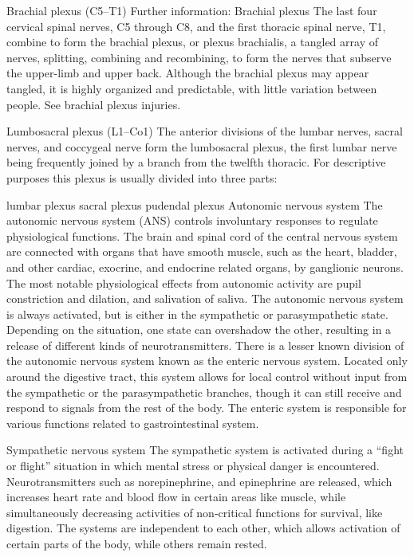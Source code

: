 Brachial plexus (C5--T1)
Further information: Brachial plexus
The last four cervical spinal nerves, C5 through C8, and the first thoracic spinal nerve, T1, combine to form the brachial plexus, or plexus brachialis, a tangled array of nerves, splitting, combining and recombining, to form the nerves that subserve the upper-limb and upper back. Although the brachial plexus may appear tangled, it is highly organized and predictable, with little variation between people. See brachial plexus injuries.

Lumbosacral plexus (L1--Co1)
The anterior divisions of the lumbar nerves, sacral nerves, and coccygeal nerve form the lumbosacral plexus, the first lumbar nerve being frequently joined by a branch from the twelfth thoracic. For descriptive purposes this plexus is usually divided into three parts:

lumbar plexus
sacral plexus
pudendal plexus
Autonomic nervous system
The autonomic nervous system (ANS) controls involuntary responses to regulate physiological functions. The brain and spinal cord of the central nervous system are connected with organs that have smooth muscle, such as the heart, bladder, and other cardiac, exocrine, and endocrine related organs, by ganglionic neurons. The most notable physiological effects from autonomic activity are pupil constriction and dilation, and salivation of saliva. The autonomic nervous system is always activated, but is either in the sympathetic or parasympathetic state. Depending on the situation, one state can overshadow the other, resulting in a release of different kinds of neurotransmitters. There is a lesser known division of the autonomic nervous system known as the enteric nervous system. Located only around the digestive tract, this system allows for local control without input from the sympathetic or the parasympathetic branches, though it can still receive and respond to signals from the rest of the body. The enteric system is responsible for various functions related to gastrointestinal system.

Sympathetic nervous system
The sympathetic system is activated during a ``fight or flight'' situation in which mental stress or physical danger is encountered. Neurotransmitters such as norepinephrine, and epinephrine are released, which increases heart rate and blood flow in certain areas like muscle, while simultaneously decreasing activities of non-critical functions for survival, like digestion. The systems are independent to each other, which allows activation of certain parts of the body, while others remain rested.

